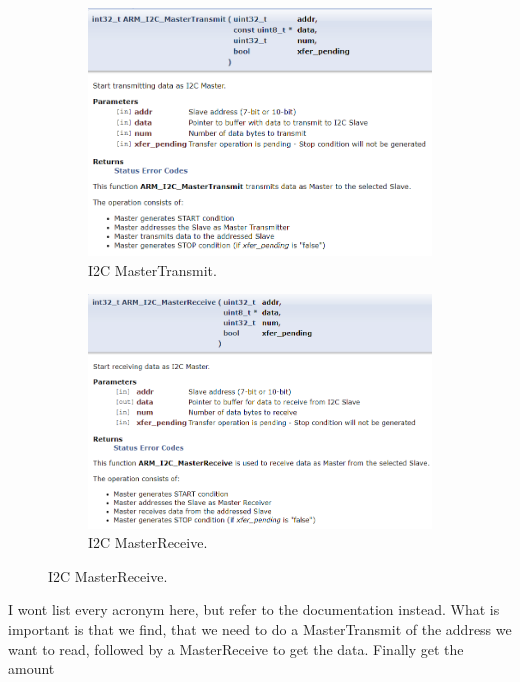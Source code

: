 \documentclass{article}
\begin{document}
\begin{figure}[H]
    \centering
    \begin{subfigure}[b]{0.45\linewidth}
        \includegraphics[width=\linewidth]{pics/I2CMasterTransmit.png}
        \caption{I2C MasterTransmit.}
    \end{subfigure}
    \begin{subfigure}[b]{0.45\linewidth}
        \includegraphics[width=\linewidth]{pics/I2CMasterReceive.png}
        \caption{I2C MasterReceive.}
    \end{subfigure}
    \label{fig:I2CDriverCommunation}
\end{figure}
I wont list every acronym here, but refer to the documentation instead.
What is important is that we find, that we need to do a MasterTransmit of the address
we want to read, followed by a MasterReceive to get the data. Finally get the amount
\end{document}
